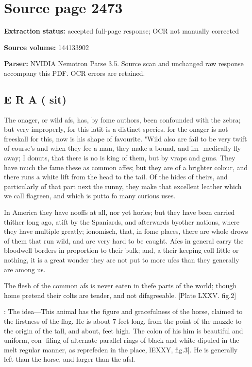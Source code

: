 \clearpage
\section{Source page 2473}
\textbf{Extraction status:} accepted full-page response; OCR not manually corrected\par
\textbf{Source volume:} 144133902\par
\textbf{Parser:} NVIDIA Nemotron Parse 3.5. Source scan and unchanged raw response accompany this PDF. OCR errors are retained.\par\medskip
\subsection*{E R A ( sit)}
The onager, or wild afs, has, by fome authors,  been confounded with the zebra; but very improperly, for this latit is a distinct species. for the onager is not freeskall for this, now is his shape of favourite. "Wild also are fail to be very twift of course’s and when they fee a man, they make a bound, and im- medically fly away; I donuts, that there is no is king of them, but by vraps and guns. They have much the fame these as common affes; but they are of a brighter colour, and there runs a white lift from the head to the tail. Of the hides of theirs, and particularly of that part next the runny, they make that excellent leather which we call flagreen, and which is putto fo many curious uses.\par\medskip
In America they have nooffs at all, nor yet horles; but they have been carried thither long ago, atift by the Spaniards, and afterwards byother nations, where they have multiple greatly; ionomisch, that, in fome places, there are whole drows of them that run wild, and are very hard to be caught. Afes in general carry the bloodwell borders in proportion to their bulk; and, a their keeping coll little or nothing, it is a great wonder they are not put to more ufes than they generally are among us.\par\medskip
The flesh of the common afs is never eaten in thefe parts of the world; though home pretend their colts are tender, and not difagreeable. [Plate LXXV. fig.2]\par{}: The idea—This animal has the figure and gracefulness of the horse, claimed to the firstness of the flag. He is about 7 feet long, from the point of the muzzle to the origin of the tall, and about, feet high. The colon of his him is beautiful and uniform, con- filing of alternate parallel rings of black and white dipuled in the melt regular manner, as reprefeden in the place, lEXXY, fig.3]. He is generally left than the horse, and larger than the afsl.\par\medskip
